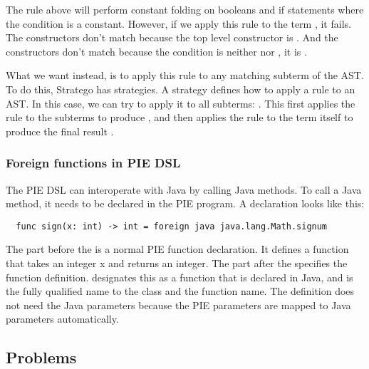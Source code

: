 The  rule above will perform constant folding on booleans and if statements where the condition is a constant.
However, if we apply this rule to the term , it fails.
The  constructors don't match because the top level constructor is .
And the  constructors don't match because the condition is neither  nor , it is .

What we want instead, is to apply this rule to any matching subterm of the \ac{AST}.
To do this, Stratego has strategies.
A strategy defines how to apply a rule to an \ac{AST}.
In this case, we can try to apply it to all subterms: .
This first applies the rule to the subterms to produce , and then applies the rule to the term itself to produce the final result .

\subsubsection{Foreign functions in \ac{PIE} \ac{DSL}}
\label{subsubsec:problem_analysis__background__foreign_functions}

The \ac{PIE} \ac{DSL} can interoperate with Java by calling Java methods.
To call a Java method, it needs to be declared in the \ac{PIE} program.
A declaration looks like this:
\begin{lstlisting}
  func sign(x: int) -> int = foreign java java.lang.Math.signum
\end{lstlisting}
The part before the \inlinecode{=} is a normal \ac{PIE} function declaration.
It defines a function  that takes an integer x and returns an integer.
The part after the \inlinecode{=} specifies the function definition.
 designates this as a function that is declared in Java, and  is the fully qualified name to the class and the function name.
The definition does not need the Java parameters because the \ac{PIE} parameters are mapped to Java parameters automatically.

\subsection{Problems}
\label{subsec:problem_analysis__problems}

